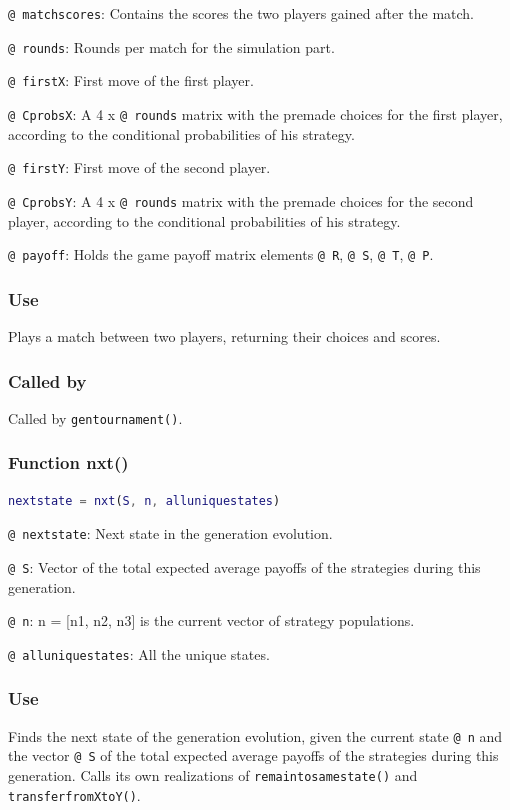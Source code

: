 \documentclass[12pt]{report}
\begin{document}
\texttt{@ matchscores}: Contains the scores the two players gained after the match.

\texttt{@ rounds}: Rounds per match for the simulation part.

\texttt{@ firstX}: First move of the first player.

\texttt{@ CprobsX}: A 4 x \texttt{@ rounds} matrix with the premade choices for the first player, according to the conditional probabilities of his strategy. 

\texttt{@ firstY}: First move of the second player.

\texttt{@ CprobsY}: A 4 x \texttt{@ rounds} matrix with the premade choices for the second player, according to the conditional probabilities of his strategy.

\texttt{@ payoff}: Holds the game payoff matrix elements \texttt{@ R}, \texttt{@ S}, \texttt{@ T}, \texttt{@ P}. 

\subsubsection*{Use }
Plays a match between two players, returning their choices and scores. 

\subsubsection*{Called by}
Called by \texttt{gentournament()}. 








\subsubsection*{Function nxt()}

\begin{lstlisting}[language=Matlab]
nextstate = nxt(S, n, alluniquestates)

\end{lstlisting}

\texttt{@ nextstate}: Next state in the generation evolution.

\texttt{@ S}: Vector of the total expected average payoffs of the strategies during this generation.

\texttt{@ n}: n = [n1, n2, n3] is the current vector of strategy populations.

\texttt{@ alluniquestates}: All the unique states.

\subsubsection*{Use }
Finds the next state of the generation evolution, given the current state \texttt{@ n} and the vector \texttt{@ S} of the total expected average payoffs of the strategies during this generation. Calls its own realizations of \texttt{remaintosamestate()} and \texttt{transferfromXtoY()}.
\end{document}
